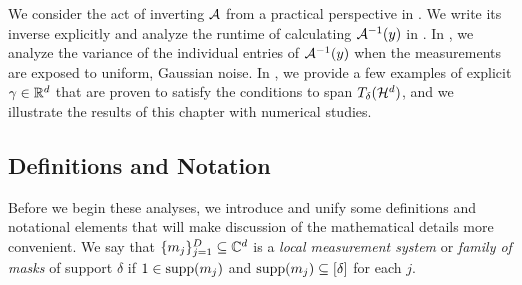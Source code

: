 

We consider the act of inverting $\mathcal{A}$ from a practical perspective in .  We write its inverse explicitly and analyze the runtime of calculating $\mathcal{A}^{-1}(y)$ in .  In , we analyze the variance of the individual entries of $\mathcal{A}^{-1}(y)$ when the measurements are exposed to uniform, Gaussian noise.  In , we provide a few examples of explicit $\gamma \in \mathbb{R}^d$ that are proven to satisfy the conditions to span $T_\delta(\mathcal{H}^d)$, and we illustrate the results of this chapter with numerical studies.

\subsection{Definitions and Notation}
Before we begin these analyses, we introduce and unify some definitions and notational elements that will make discussion of the mathematical details more convenient.  We say that $\{m_j\}_{j = 1}^D \subseteq \mathbb{C}^d$ is a \emph{local measurement system} or \emph{family of masks} of support $\delta$ if $1 \in \operatorname{supp}(m_j)$ and $\operatorname{supp}(m_j) \subseteq [\delta]$ for each $j$.

